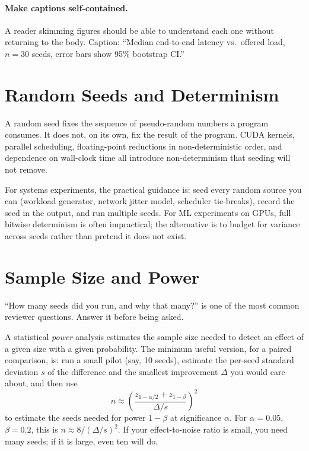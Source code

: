 \documentclass[11pt]{article}
\begin{document}
\paragraph{Make captions self-contained.} A reader skimming figures should be able to understand each one without returning to the body. Caption: ``Median end-to-end latency vs.\ offered load, $n=30$ seeds, error bars show 95\% bootstrap CI.''

\section{Random Seeds and Determinism}
\label{sec:seeds}

A random seed fixes the sequence of pseudo-random numbers a program consumes. It does not, on its own, fix the result of the program. CUDA kernels, parallel scheduling, floating-point reductions in non-deterministic order, and dependence on wall-clock time all introduce non-determinism that seeding will not remove.

For systems experiments, the practical guidance is: seed every random source you can (workload generator, network jitter model, scheduler tie-breaks), record the seed in the output, and run multiple seeds. For ML experiments on GPUs, full bitwise determinism is often impractical; the alternative is to budget for variance across seeds rather than pretend it does not exist.

\section{Sample Size and Power}
\label{sec:sample-size}

``How many seeds did you run, and why that many?'' is one of the most common reviewer questions. Answer it before being asked.

A statistical \emph{power} analysis estimates the sample size needed to detect an effect of a given size with a given probability. The minimum useful version, for a paired comparison, is: run a small pilot (say, 10 seeds), estimate the per-seed standard deviation $s$ of the difference and the smallest improvement $\Delta$ you would care about, and then use
\[
n \approx \left(\frac{z_{1-\alpha/2} + z_{1-\beta}}{\Delta / s}\right)^2
\]
to estimate the seeds needed for power $1-\beta$ at significance $\alpha$. For $\alpha = 0.05$, $\beta = 0.2$, this is $n \approx 8 / (\Delta/s)^2$. If your effect-to-noise ratio is small, you need many seeds; if it is large, even ten will do.
\end{document}
